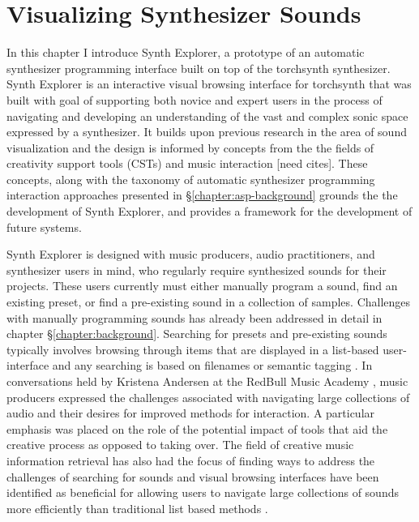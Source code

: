 \graphicspath{{./}{./figures/}{./figures/synthexplore/}}




\chapter{Visualizing Synthesizer Sounds}
\label{ch:visualization}
In this chapter I introduce Synth Explorer, a prototype of an automatic synthesizer programming interface built on top of the torchsynth synthesizer. Synth Explorer is an interactive visual browsing interface for torchsynth that was built with goal of supporting both novice and expert users in the process of navigating and developing an understanding of the vast and complex sonic space expressed by a synthesizer. It builds upon previous research in the area of sound visualization and the design is informed by concepts from the the fields of creativity support tools (CSTs) and music interaction [need cites]. These concepts, along with the taxonomy of automatic synthesizer programming interaction approaches presented in \S\ref{chapter:asp-background} grounds the the development of Synth Explorer, and provides a framework for the development of future systems. %

Synth Explorer is designed with music producers, audio practitioners, and synthesizer users in mind, who regularly require synthesized sounds for their projects. These users currently must either manually program a sound, find an existing preset, or find a pre-existing sound in a collection of samples. Challenges with manually programming sounds has already been addressed in detail in chapter \S\ref{chapter:background}. Searching for presets and pre-existing sounds typically involves browsing through items that are displayed in a list-based user-interface and any searching is based on filenames or semantic tagging \cite{knees2016searching}. In conversations held by Kristena Andersen at the RedBull Music Academy \cite{andersen2016conversations}, music producers expressed the challenges associated with navigating large collections of audio and their desires for improved methods for interaction. A particular emphasis was placed on the role of the potential impact of tools that aid the creative process as opposed to taking over. The field of creative music information retrieval has also had the focus of finding ways to address the challenges of searching for sounds \cite{humphrey2013brief} and visual browsing interfaces have been identified as beneficial for allowing users to navigate large collections of sounds more efficiently than traditional list based methods \cite{turquois2016exploring}.

